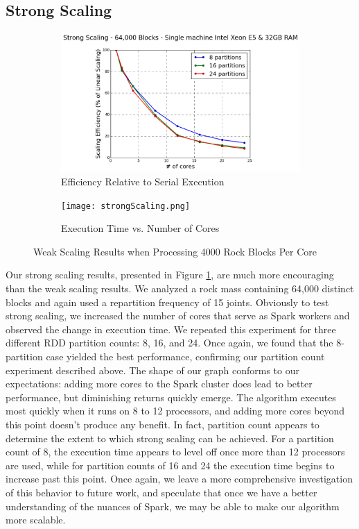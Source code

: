 \subsection{Strong Scaling}
\begin{figure}[t]
\centering
\begin{subfigure}{0.5\textwidth}
    \centering
    \includegraphics[width=0.4\linewidth]{strongScalingEfficiency.png}
    \caption{Efficiency Relative to Serial Execution}
\end{subfigure}%
\begin{subfigure}{0.5\textwidth}
    \centering
    \texttt{[image: strongScaling.png]}
    \caption{Execution Time vs. Number of Cores}
\end{subfigure}
\caption{Weak Scaling Results when Processing 4000 Rock Blocks Per Core}
\label{fig:strongScaling}
\end{figure}

Our strong scaling results, presented in Figure \ref{fig:strongScaling}, are much more encouraging than the weak scaling results. We analyzed a rock mass containing 64,000 distinct blocks and again used a repartition frequency of 15 joints. Obviously to test strong scaling, we increased the number of cores that serve as Spark workers and observed the change in execution time. We repeated this experiment for three different RDD partition counts: 8, 16, and 24. Once again, we found that the 8-partition case yielded the best performance, confirming our partition count experiment described above. The shape of our graph conforms to our expectations: adding more cores to the Spark cluster does lead to better performance, but diminishing returns quickly emerge. The algorithm executes most quickly when it runs on 8 to 12 processors, and adding more cores beyond this point doesn't produce any benefit. In fact, partition count appears to determine the extent to which strong scaling can be achieved. For a partition count of 8, the execution time appears to level off once more than 12 processors are used, while for partition counts of 16 and 24 the execution time begins to increase past this point. Once again, we leave a more comprehensive investigation of this behavior to future work, and speculate that once we have a better understanding of the nuances of Spark, we may be able to make our algorithm more scalable.

